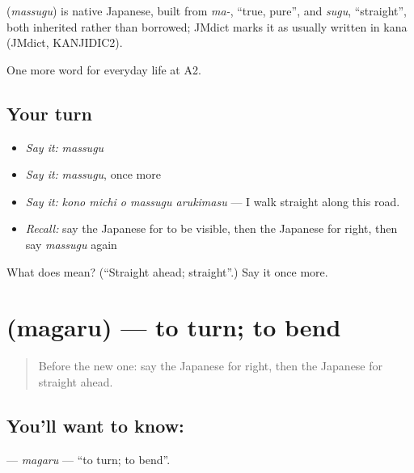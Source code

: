 \begin{cousinweb}
\textbf{} (\emph{massugu}) is native Japanese, built from \emph{ma-}, \textquotedblleft{}true, pure\textquotedblright{}, and \emph{sugu}, \textquotedblleft{}straight\textquotedblright{}, both inherited rather than borrowed; JMdict marks it as usually written in kana (JMdict, KANJIDIC2).
\end{cousinweb}

\begin{grammarlens}[title={What you've built}]
One more word for everyday life at A2.
\end{grammarlens}

\subsection*{Your turn}
\begin{itemize}
\raggedright
  \item \emph{Say it:} \emph{massugu}
  \item \emph{Say it:} \emph{massugu}, once more
  \item \emph{Say it:} \emph{kono michi o massugu arukimasu} — I walk straight along this road.
  \item \emph{Recall:} say the Japanese for to be visible, then the Japanese for right, then say \emph{massugu} again
\end{itemize}

\begin{tcolorbox}[breakable,colback=teal!4,colframe=teal!35!black,title={Before you move on}]
What does  mean? (\textquotedblleft{}Straight ahead; straight\textquotedblright{}.) Say it once more.
\end{tcolorbox}
\section[\texorpdfstring{\ja{まがる} (magaru)}{まがる (magaru)}]{ (magaru) — to turn; to bend}

\label{lesson:JA-C194-magaru}



\begin{quote}
Before the new one: say the Japanese for right, then the Japanese for straight ahead.
\end{quote}

\subsection*{You'll want to know: }
\textbf{} — \emph{magaru} — \textquotedblleft{}to turn; to bend\textquotedblright{}.

